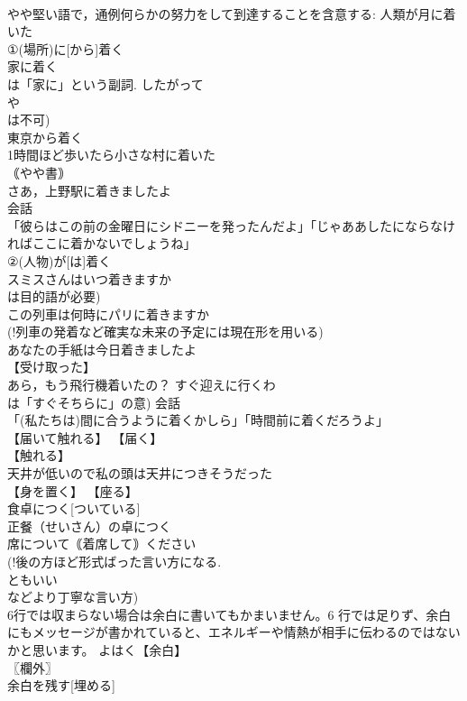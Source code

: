 \documentclass[8pt]{extreport}
\begin{document}
\begin{CJK}{UTF8}{min}
\\	やや堅い語で，通例何らかの努力をして到達することを含意する: 人類が月に着いた 
\\	①(場所)に[から]着く 
\\	家に着く 
\\	は「家に」という副詞. したがって 
\\	や 
\\	は不可) 
\\	東京から着く 
\\	1時間ほど歩いたら小さな村に着いた 
\\	｟やや書｠
\\	さあ，上野駅に着きましたよ 
\\	会話 
\\	「彼らはこの前の金曜日にシドニーを発ったんだよ」「じゃああしたにならなければここに着かないでしょうね」 
\\	②(人物)が[は]着く 
\\	スミスさんはいつ着きますか 
\\	は目的語が必要) 
\\	この列車は何時にパリに着きますか 
\\	(!列車の発着など確実な未来の予定には現在形を用いる) 
\\	あなたの手紙は今日着きましたよ 
\\	【受け取った】
\\	あら，もう飛行機着いたの？ すぐ迎えに行くわ 
\\	は「すぐそちらに」の意) 会話 
\\	「(私たちは)間に合うように着くかしら」「時間前に着くだろうよ」 
\\	【届いて触れる】 【届く】
\\	【触れる】
\\	天井が低いので私の頭は天井につきそうだった 
\\	【身を置く】 【座る】
\\	食卓につく[ついている] 
\\	正餐（せいさん）の卓につく 
\\	席について｟着席して｠ください 
\\	(!後の方ほど形式ばった言い方になる. 
\\	ともいい 
\\	などより丁寧な言い方)
\\	6行では収まらない場合は余白に書いてもかまいません。6 行では足りず、余白にもメッセージが書かれていると、エネルギーや情熱が相手に伝わるのではないかと思います。		よはく【余白】 
\\	〖欄外〗
\\	余白を残す[埋める] 

\end{CJK}
\end{document}
